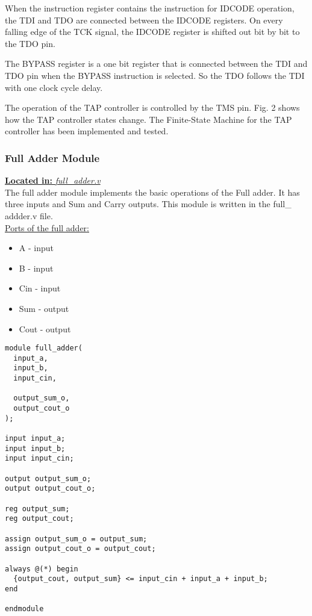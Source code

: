 \documentclass[a4paper,11pt]{article}
\begin{document}
When the instruction register contains the instruction for IDCODE operation, the TDI and TDO are connected between the IDCODE registers. On every falling edge of the TCK signal, the IDCODE register is shifted out bit by bit to the TDO pin.

The BYPASS register is a one bit register that is connected between the TDI and TDO pin when the BYPASS instruction is selected. So the TDO follows the TDI with one clock cycle delay.

The operation of the TAP controller is controlled by the TMS pin. Fig. 2 shows how the TAP controller states change. The Finite-State Machine for the TAP controller has been implemented and tested.


\FloatBarrier
\subsubsection{Full Adder Module}
\underline{\textbf{Located in:} \textit{full\_adder.v}}\\

The full adder module implements the basic operations of the Full adder. It has three inputs and Sum and Carry outputs. This module is written in the full\_ addder.v file.\\

\underline{Ports of the full adder:}
\begin{itemize}[noitemsep]
\item A - input
\item B - input
\item Cin - input
\item Sum - output
\item Cout - output
\end{itemize}

\begin{lstlisting}[style={verilog-style}, backgroundcolor=\color{lightgray}]
module full_adder(
  input_a,
  input_b,
  input_cin,
	
  output_sum_o,
  output_cout_o
);

input input_a;
input input_b;
input input_cin;

output output_sum_o;
output output_cout_o;

reg output_sum;
reg output_cout;

assign output_sum_o = output_sum;
assign output_cout_o = output_cout;

always @(*) begin
  {output_cout, output_sum} <= input_cin + input_a + input_b;
end

endmodule
\end{lstlisting}
\FloatBarrier
\end{document}
